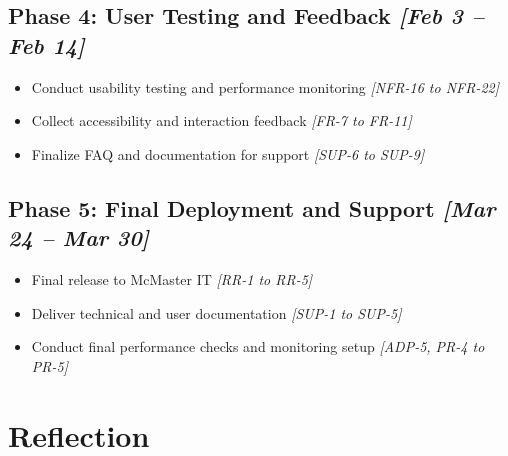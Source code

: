 \documentclass{article}
\begin{document}
\subsection*{Phase 4: User Testing and Feedback \hfill \textit{[Feb 3 – Feb 14]}}

\begin{itemize}
  \item Conduct usability testing and performance monitoring \hfill \textit{[NFR-16 to NFR-22]}
  \item Collect accessibility and interaction feedback \hfill \textit{[FR-7 to FR-11]}
  \item Finalize FAQ and documentation for support \hfill \textit{[SUP-6 to SUP-9]}
\end{itemize}

\subsection*{Phase 5: Final Deployment and Support \hfill \textit{[Mar 24 – Mar 30]}}

\begin{itemize}
  \item Final release to McMaster IT \hfill \textit{[RR-1 to RR-5]}
  \item Deliver technical and user documentation \hfill \textit{[SUP-1 to SUP-5]}
  \item Conduct final performance checks and monitoring setup \hfill \textit{[ADP-5, PR-4 to PR-5]}
\end{itemize}


\section{Reflection}
\end{document}
